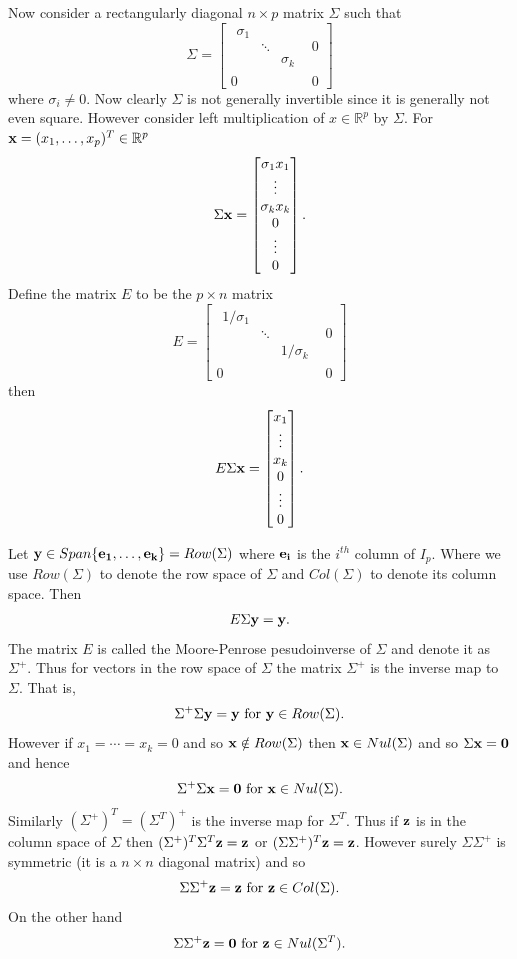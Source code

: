 \documentclass{book}
\begin{document}
Now consider a rectangularly diagonal $n \times p$ matrix $\Sigma$ such that 
$$
\Sigma=
\left[
\begin{array}{c|c}
\begin{matrix}
\sigma_1& & \\
& \ddots& \\
& & \sigma_k
\end{matrix}& 0\\\hline
0& 0
\end{array}
\right]
$$
where $\sigma_i \neq 0$. Now clearly $\Sigma$ is not generally invertible since it is generally not even square. However consider left multiplication of $x\in\mathbb{R}^p$ by $\Sigma$. For ${\bf x}=(x_1,\ldots,x_p)^T\in \mathbb{R}^p$
$$
\Sigma{\bf x}=
\begin{bmatrix}
\sigma_1x_1\\
\vdots\\
\sigma_kx_k\\
0\\
\vdots\\
0
\end{bmatrix}.
$$
Define the matrix $E$ to be the $p \times n$ matrix
$$
E=
\left[
\begin{array}{c|c}
\begin{matrix}
1/\sigma_1& & \\
& \ddots& \\
& & 1/\sigma_k
\end{matrix}& 0\\\hline
0& 0
\end{array}
\right]
$$
then 
$$
E\Sigma{\bf x}=
\begin{bmatrix}
x_1\\
\vdots\\
x_k\\
0\\
\vdots\\
0
\end{bmatrix}.
$$

Let ${\bf y}\in Span\{{\bf e_1},\ldots,{\bf e_k}\}=Row(\Sigma)$ where ${\bf e_i}$ is the $i^{th}$ column of $I_p$. Where we use $Row(\Sigma)$ to denote the row space of $\Sigma$ and $Col(\Sigma)$ to denote its column space. Then 
$$
E\Sigma{\bf y}={\bf y}.
$$
The matrix $E$ is called the Moore-Penrose pesudoinverse of $\Sigma$ and denote it as $\Sigma^{+}$. Thus for vectors in the row space of $\Sigma$ the matrix $\Sigma^{+}$ is the inverse map to $\Sigma$. That is, 
$$\Sigma^+\Sigma{\bf y}={\bf y}\text{ for }{\bf y}\in Row(\Sigma).$$
 However if $x_1=\cdots=x_k=0$ and so ${\bf x} \notin Row(\Sigma)$ then ${\bf x}\in Nul(\Sigma)$ and so $\Sigma{\bf x}={\bf 0}$ and hence 
$$
\Sigma^+\Sigma{\bf x}={\bf 0}\text{ for }{\bf x}\in Nul(\Sigma).
$$  
Similarly $(\Sigma^{+})^T=(\Sigma^T)^{+}$ is the inverse map for $\Sigma^T$. Thus if ${\bf z}$ is in the column space of $\Sigma$ then $(\Sigma^+)^T\Sigma^T{\bf z}={\bf z}$ or $(\Sigma\Sigma^+)^T{\bf z}={\bf z}$. However surely $\Sigma\Sigma^+$ is symmetric (it is a $n \times n$ diagonal matrix) and so 
$$
\Sigma\Sigma^+{\bf z}={\bf z}\text{ for }{\bf z} \in Col(\Sigma).$$
On the other hand 
$$\Sigma\Sigma^+{\bf z}={\bf 0}\text{ for }{\bf z} \in Nul(\Sigma^T).$$
\end{document}
